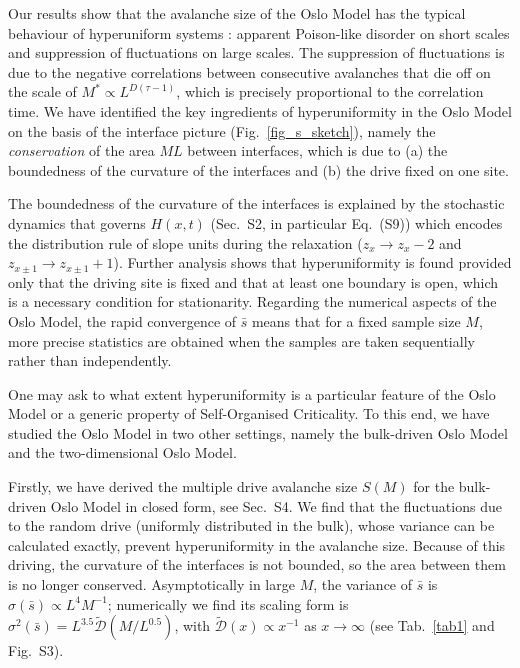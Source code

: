\documentclass[doublecol]{epl2}
\newcommand{\Figref}[1]{Fig.~\ref{fig_#1}}
\newcommand{\bungledXR}[2]{#2}
\newcommand{\wasrevised}[1]{#1}
\begin{document}
Our results show that the avalanche size of the Oslo Model has the typical behaviour of hyperuniform systems \cite{Torquato:2003aa,Hexner:2017aa,zachary2009hyperuniformity,berthier2011suppressed}: apparent Poison-like disorder on short scales and suppression of fluctuations on large scales. The suppression of fluctuations is due to the negative correlations between consecutive avalanches that die off on the scale of $M^*\propto L^{D(\tau-1)}$, which is precisely proportional to the correlation time.  We have identified the  \wasrevised{key ingredients} of hyperuniformity in  \wasrevised{the Oslo Model on the basis of} the interface picture (\Figref{s_sketch}), namely the \emph{conservation} of the area $ML$ between interfaces, which is due to (a) the boundedness of the curvature of the interfaces and (b) the drive fixed on one site.

The boundedness of the curvature of the interfaces is explained by the stochastic dynamics that governs $H(x,t)$ (\bungledXR{\ref{sect_app_interface}}{Sec.~S2}, in particular \bungledXR{}{Eq.~(S9)}) which encodes the distribution rule of slope units during the relaxation ($z_x\to z_x-2$ and $z_{x\pm1}\to z_{x\pm1}+1$). Further analysis shows that hyperuniformity is found provided only that the driving site is fixed and that at least one boundary is open, which is a necessary condition for stationarity. 
Regarding the numerical aspects of the Oslo Model, the rapid convergence of $\bar{s}$ means that for a fixed sample size $M$, more precise statistics are obtained when the samples are taken sequentially rather than independently.

One may ask to what extent hyperuniformity is a particular feature of the Oslo Model or a generic property of Self-Organised Criticality. To this end, we have studied the Oslo Model in two other settings\wasrevised{,}  \wasrevised{namely the bulk-driven Oslo Model and the two-dimensional Oslo Model}.

Firstly, we have derived the multiple drive avalanche size $S\wasrevised{(M)}$ for the bulk-driven Oslo Model \cite{PhysRevE.78.041102, pruessner2012self} in closed form\wasrevised{, see} \bungledXR{\ref{sect_app_bulk}}{Sec.~S4}.
  We find that the fluctuations due to the random drive (uniformly distributed in the bulk), whose variance can be calculated exactly, prevent hyperuniformity in the avalanche size.  Because of this driving, the curvature of the interfaces is not bounded, so the area between them is no longer conserved.
  Asymptotically in large $M$, the variance of $\bar{s}$ is $\sigma(\bar{s})\propto L^4M^{-1}$; numerically we find its scaling form is
$\sigma^2(\bar{s}) = L^{3.5}\tilde{\mathcal{D}}\left({M}/{L^{0.5}}\right)$,
with $\tilde{\mathcal{D}}(x)\propto x^{-1}$ as $x\to\infty$ (see Tab.~\ref{tab1} and \bungledXR{\Figref{oobulk}}{Fig.~S3}).
  
\end{document}
